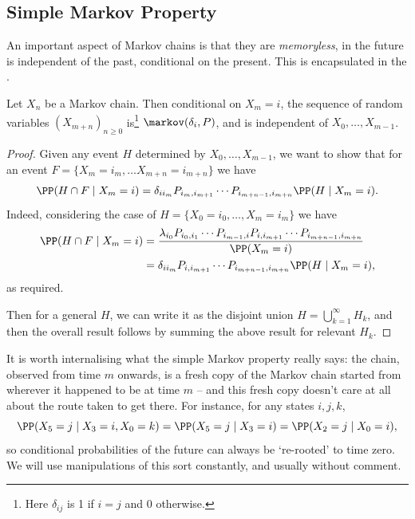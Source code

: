 \subsection{Simple Markov Property}

An important aspect of Markov chains is that they are \emph{memoryless}, in the future is independent of the past, conditional on the present. This is encapsulated in the .

\begin{theorem}
	Let $X_n$ be a Markov chain. Then conditional on $X_m = i$, the sequence of random variables $(X_{m + n})_{n \geq 0}$ is\footnote{Here $\delta_{ij}$ is 1 if $i = j$ and 0 otherwise.} $\markov(\delta_i, P)$, and is independent of $X_0, \dots, X_{m - 1}$.
\end{theorem}
\begin{proof}
	Given any event $H$ determined by $X_0, \dots, X_{m - 1}$, we want to show that for an event $F = \{X_m = i_m, \dots X_{m + n} = i_{m +n}\}$ we have
	$$
	\PP(H \cap F \mid X_m = i) = \delta_{ii_m}P_{i_m, i_{m + 1}} \cdots P_{i_{m + n-1}, i_{m + n}} \PP(H \mid X_m = i).
	$$
	Indeed, considering the case of $H = \{X_0 = i_0, \dots, X_m = i_m\}$ we have
	\begin{align*}
		\PP(H \cap F \mid X_m = i) &= \frac{\lambda_{i_0}P_{i_0, i_1} \cdots P_{i_{m - 1}, i}P_{i, i_{m + 1}} \cdots P_{i_{m + n - 1}, i_{m + n}}}{\PP(X_m = i)} \\
		&= \delta_{i i_m}P_{i, i_{m + 1}} \cdots P_{i_{m + n - 1}, i_{m + n}} \PP(H \mid X_m = i),
	\end{align*}
	as required. 
	
	Then for a general $H$, we can write it as the disjoint union $H = \bigcup_{k = 1}^{\infty} H_k$, and then the overall result follows by summing the above result for relevant $H_k$.
\end{proof}

\begin{remark}
	It is worth internalising what the simple Markov property really says: the chain, observed from time $m$ onwards, is a fresh copy of the Markov chain started from wherever it happened to be at time $m$ -- and this fresh copy doesn't care at all about the route taken to get there. For instance, for any states $i, j, k$,
	$$
	\PP(X_5 = j \mid X_3 = i, X_0 = k) = \PP(X_5 = j \mid X_3 = i) = \PP(X_2 = j \mid X_0 = i),
	$$
	so conditional probabilities of the future can always be `re-rooted' to time zero. We will use manipulations of this sort constantly, and usually without comment.
\end{remark}

